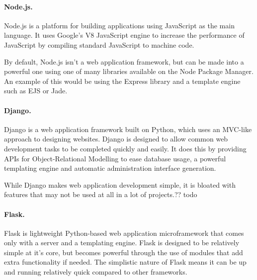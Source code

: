 \documentclass[a4paper, 12pt]{article}
\begin{document}
\paragraph{Node.js.}
Node.js is a platform for building applications using JavaScript as the main language. It uses Google's V8 JavaScript engine to increase the performance of JavaScript by compiling standard JavaScript to machine code.


By default, Node.js isn't a web application framework, but can be made into a powerful one using one of many libraries available on the Node Package Manager. An example of this would be using the Express library and a template engine such as EJS or Jade.




\paragraph{Django.}
Django is a web application framework built on Python, which uses an MVC-like approach to designing websites.\cite{django} Django is designed to allow common web development tasks to be completed quickly and easily. It does this by providing APIs for Object-Relational Modelling to ease database usage, a powerful templating engine and automatic administration interface generation.\cite{djangooverview}


While Django makes web application development simple, it is bloated with features that may not be used at all in a lot of projects.?? todo


\paragraph{Flask.}
Flask is lightweight Python-based web application microframework that comes only with a server and a templating engine. Flask is designed to be relatively simple at it's core, but becomes powerful through the use of modules that add extra functionality if needed. The simplistic nature of Flask means it can be up and running relatively quick compared to other frameworks.

\end{document}
